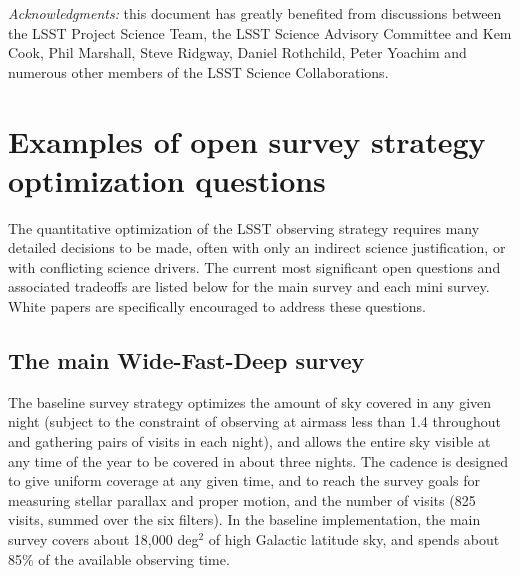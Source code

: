 \documentclass[DM,lsstdraft,toc,usenatbib]{lsstdoc}
\begin{document}
\vskip 0.2in 
{\it Acknowledgments:} this document has greatly benefited from discussions between 
the LSST Project Science Team, the LSST Science Advisory Committee and Kem Cook, 
Phil Marshall, Steve Ridgway, Daniel Rothchild, Peter Yoachim and numerous other members 
of the LSST Science Collaborations. 

\newpage
\appendix
\section{Examples of open survey strategy optimization questions} 

The quantitative optimization of the LSST observing strategy requires many 
detailed decisions to be made, often with only an indirect science justification,
or with conflicting science drivers.  The current most significant open questions and associated 
tradeoffs are listed below for the main survey and each mini survey. White papers are specifically 
encouraged to address these questions.


\subsection{The main Wide-Fast-Deep survey} 

The baseline survey strategy optimizes the amount of sky covered in any given night (subject to 
the constraint of observing at airmass less than 1.4 throughout and gathering pairs of visits in each night), and allows the entire sky 
visible at any time of the year to be covered in about three nights. The cadence is designed 
to give uniform coverage at any given time, and to reach the survey goals for measuring 
stellar parallax and proper motion, and the number of visits (825 visits, summed over the 
six filters). In the baseline implementation, the main survey covers about 18,000 deg$^2$ of 
high Galactic latitude sky, and spends about 85\% of the available observing time. 
\end{document}
